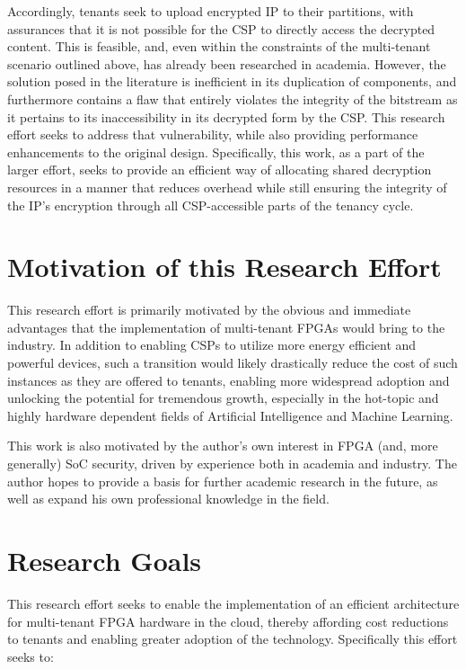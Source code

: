 Accordingly, tenants seek to upload encrypted IP to their partitions, with assurances that it is not possible for the CSP to directly access the decrypted content. This is feasible, and, even within the constraints of the multi-tenant scenario outlined above, has already been researched in academia. However, the solution posed in the literature is inefficient in its duplication of components, and furthermore contains a flaw that entirely violates the integrity of the bitstream as it pertains to its inaccessibility in its decrypted form by the CSP. This research effort seeks to address that vulnerability, while also providing performance enhancements to the original design. Specifically, this work, as a part of the larger effort, seeks to provide an efficient way of allocating shared decryption resources in a manner that reduces overhead while still ensuring the integrity of the IP's encryption through all CSP-accessible parts of the tenancy cycle.

\section{Motivation of this Research Effort}\label{Sec:motivation}
This research effort is primarily motivated by the obvious and immediate advantages that the implementation of multi-tenant FPGAs would bring to the industry. In addition to enabling CSPs to utilize more energy efficient and powerful devices, such a transition would likely drastically reduce the cost of such instances as they are offered to tenants, enabling more widespread adoption and unlocking the potential for tremendous growth, especially in the hot-topic and highly hardware dependent fields of Artificial Intelligence and Machine Learning.

This work is also motivated by the author's own interest in FPGA (and, more generally) SoC security, driven by experience both in academia and industry. The author hopes to provide a basis for further academic research in the future, as well as expand his own professional knowledge in the field.

\section{Research Goals}\label{Sec:goals}
This research effort seeks to enable the implementation of an efficient architecture for multi-tenant FPGA hardware in the cloud, thereby affording cost reductions to tenants and enabling greater adoption of the technology. Specifically this effort seeks to:

